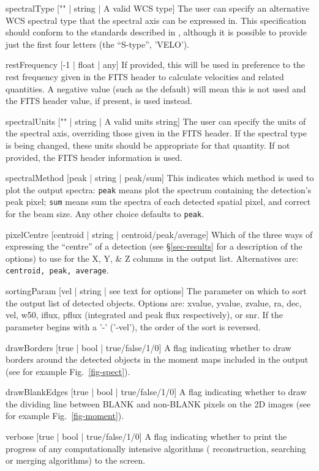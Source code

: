 \begin{Lentry}
\item[{spectralType ["" | string | A valid WCS type]}] The user can
  specify an alternative WCS spectral type that the spectral axis can
  be expressed in. This specification should conform to the standards
  described in \citet{greisen06}, although it is possible to provide
  just the first four letters (the ``S-type'', \eg 'VELO').
\item[{restFrequency [-1 | float | any]}] If provided, this will be used in
  preference to the rest frequency given in the FITS header to
  calculate velocities and related quantities. A negative value (such
  as the default) will mean this is not used and the FITS header
  value, if present, is used instead.
\item[{spectralUnits ["" | string | A valid units string]}] The user
  can specify the units of the spectral axis, overriding those given
  in the FITS header. If the spectral type is being changed, these
  units should be appropriate for that quantity. If not provided, the
  FITS header information is used.
\end{Lentry}

\begin{Lentry}
\item[{spectralMethod [peak | string | peak/sum]}] This indicates
  which method is used to plot the output spectra: \texttt{peak} means
  plot the spectrum containing the detection's peak pixel;
  \texttt{sum} means sum the spectra of each detected spatial pixel,
  and correct for the beam size. Any other choice defaults to
  \texttt{peak}.
\item[{pixelCentre [centroid | string | centroid/peak/average]}] Which
  of the three ways of expressing the ``centre'' of a detection (see
  \S\ref{sec-results} for a description of the options) to use for the
  X, Y, \& Z columns in the output list. Alternatives are:
  \texttt{centroid, peak, average}.
\item[{sortingParam [vel | string | see text for options]}] The
  parameter on which to sort the output list of detected
  objects. Options are: xvalue, yvalue, zvalue, ra, dec, vel, w50,
  iflux, pflux (integrated and peak flux respectively), or snr. If the
  parameter begins with a '-' (\eg '-vel'), the order of the sort is
  reversed.
\item[{drawBorders [true | bool | true/false/1/0]}] A flag indicating whether to draw
  borders around the detected objects in the moment maps included in
  the output (see for example Fig.~\ref{fig-spect}).
\item[{drawBlankEdges [true | bool | true/false/1/0]}] A flag indicating whether to
  draw the dividing line between BLANK and non-BLANK pixels on the
  2D images (see for example Fig.~\ref{fig-moment}).
\item[{verbose [true | bool | true/false/1/0]}] A flag indicating whether to print the
  progress of any computationally intensive algorithms (\eg
  reconstruction, searching or merging algorithms) to the screen.
\end{Lentry}


